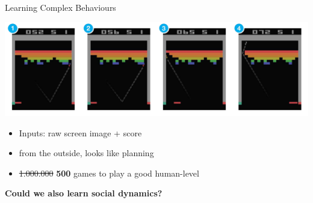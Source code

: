 \documentclass[xcolor=table]{beamer}
\begin{document}
{
\begin{frame}{Learning Complex Behaviours}

    \begin{center}
        \includegraphics[width=\linewidth]{breakout}
    \end{center}


        \begin{itemize}
            \item Inputs: raw screen image + score
            \item from the outside, looks like planning
            \item<2-> \sout{1.000.000} {\bf 500} games to play a good human-level
        \end{itemize}

     {
        \begin{center}
            {\bf Could we also learn social dynamics?}
        \end{center}
    }
\end{frame}
}

\end{document}

